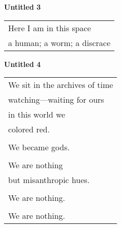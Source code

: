 \documentclass{article}
\begin{document}

\begin{center}
\textbf{Untitled 3} \\
\vspace*{2ex}
\begin{tabular}{l}
Here I am in this space \\
a human; a worm; a discrace \\
 
\end{tabular}
\end{center}

\begin{center}
\textbf{Untitled 4} \\
\vspace*{2ex}
\begin{tabular}{l}
We sit in the archives of time \\
watching---waiting for ours \\
in this world we \\
colored red. \\
\\
We became gods. \\
\\
We are nothing \\
but misanthropic hues. \\
\\
We are nothing. \\
\\
We are nothing. \\
\end{tabular}
\end{center}
\end{document}
